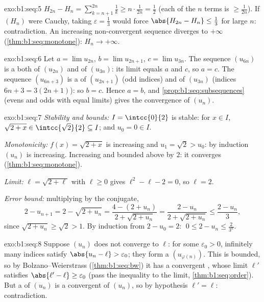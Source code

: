 \begin{solution}{exo:b1:seq:5}
$H_{2n} - H_n = \sum_{k=n+1}^{2n} \frac 1k \geq n \cdot
\frac{1}{2n} = \frac12$ (each of the $n$ terms is $\geq
\frac{1}{2n}$). If $(H_n)$ were Cauchy, taking $\varepsilon =
\frac13$ would force $\abs{H_{2n} - H_n} \leq \frac13$ for large
$n$: contradiction. An increasing non-convergent sequence diverges to
$+\infty$ (\cref{thm:b1:seq:monotone}): $H_n \to +\infty$.
\end{solution}

\begin{solution}{exo:b1:seq:6}
Let $a = \lim u_{2n}$, $b = \lim u_{2n+1}$, $c = \lim u_{3n}$. The
sequence $(u_{6n})$ is a  both of $(u_{2n})$ and of
$(u_{3n})$: its limit equals $a$ and $c$, so $a = c$. The sequence
$(u_{6n+3})$ is a  of $(u_{2n+1})$ (odd indices) and of
$(u_{3n})$ (indices $6n + 3 = 3(2n+1)$): so $b = c$. Hence $a = b$,
and \cref{prop:b1:seq:subsequences} (evens and odds with equal
limits) gives the convergence of $(u_n)$.
\end{solution}

\begin{solution}{exo:b1:seq:7}
\emph{Stability and bounds:} $I = \intcc{0}{2}$ is stable: for $x \in
I$, $\sqrt{2 + x} \in \intcc{\sqrt 2}{2} \subseteq I$; and $u_0 = 0
\in I$.

\emph{Monotonicity:} $f(x) = \sqrt{2+x}$ is increasing and $u_1 =
\sqrt 2 > u_0$: by induction $(u_n)$ is increasing. Increasing and
bounded above by $2$: it converges
(\cref{thm:b1:seq:monotone}).

\emph{Limit:} $\ell = \sqrt{2 + \ell}$ with $\ell \geq 0$ gives
$\ell^2 - \ell - 2 = 0$, so $\ell = 2$.

\emph{Error bound:} multiplying by the conjugate,
\[
2 - u_{n+1} = 2 - \sqrt{2 + u_n}
= \frac{4 - (2 + u_n)}{2 + \sqrt{2+u_n}}
= \frac{2 - u_n}{2 + \sqrt{2 + u_n}}
\leq \frac{2 - u_n}{3},
\]
since $\sqrt{2 + u_n} \geq \sqrt 2 > 1$. By induction from $2 - u_0
= 2$: $\;0 \leq 2 - u_n \leq \frac{2}{3^n}$.
\end{solution}

\begin{solution}{exo:b1:seq:8}
Suppose $(u_n)$ does not converge to $\ell$: for some $\varepsilon_0
> 0$, infinitely many indices satisfy $\abs{u_n - \ell} >
\varepsilon_0$; they form a  $(u_{\varphi(n)})$. This
 is bounded, so by Bolzano--Weierstrass
(\cref{thm:b1:seq:bw}) it has a convergent , whose
limit $\ell'$ satisfies $\abs{\ell' - \ell} \geq \varepsilon_0$
(pass the inequality to the limit, \cref{thm:b1:seq:order}). But a
 of $(u_n)$ is a convergent  of $(u_n)$,
so by hypothesis $\ell' = \ell$: contradiction.
\end{solution}

